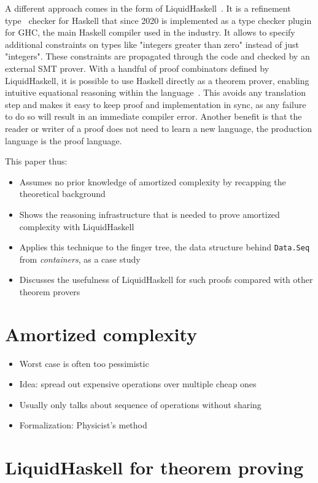 \documentclass[sigplan,screen]{acmart}
\begin{document}
A different approach comes in the form of LiquidHaskell~\cite{liquidhaskell}. It is a refinement type~\cite{refinement_types} checker for Haskell that since 2020 is implemented as a type checker plugin for GHC, the main Haskell compiler used in the industry. It allows to specify additional constraints on types like "integers greater than zero" instead of just "integers". These constraints are propagated through the code and checked by an external SMT prover. With a handful of proof combinators defined by LiquidHaskell, it is possible to use Haskell directly as a theorem prover, enabling intuitive equational reasoning within the language~\cite{tpfa}. This avoids any translation step and makes it easy to keep proof and implementation in sync, as any failure to do so will result in an immediate compiler error. Another benefit is that the reader or writer of a proof does not need to learn a new language, the production language is the proof language.

This paper thus:
\begin{itemize}
\item{Assumes no prior knowledge of amortized complexity by recapping the theoretical background}
\item{Shows the reasoning infrastructure that is needed to prove amortized complexity with LiquidHaskell}
\item{Applies this technique to the finger tree, the data structure behind \texttt{Data.Seq} from \textit{containers}, as a case study}
\item{Discusses the usefulness of LiquidHaskell for such proofs compared with other theorem provers}
\end{itemize}

\section{Amortized complexity}\label{sec:complexity}

\begin{itemize}
\item{Worst case is often too pessimistic}
\item{Idea: spread out expensive operations over multiple cheap ones}
\item{Usually only talks about sequence of operations without sharing}
\item{Formalization: Physicist's method}
\end{itemize}

\section{LiquidHaskell for theorem proving}
\end{document}
